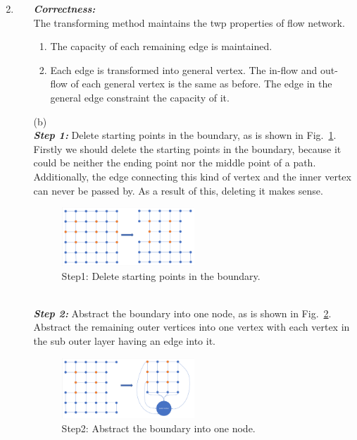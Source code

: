 \documentclass[12pt,a4paper]{article}
\makeatletter
\newtheorem*{solution}{Solution}
\theoremstyle{definition}
\renewenvironment{solution}[1][Solution] {\par\pushQED{\qed}\normalfont\topsep6\p@\@plus6\p@\relax\trivlist\item[\hskip\labelsep\bfseries#1\@addpunct{.}]\ignorespaces}{\popQED\endtrivlist\@endpefalse} \makeatother
\makeatother
\begin{document}
\begin{enumerate}
\begin{solution}
\begin{enumerate}
\begin{figure}[!htbp]
    	\end{figure}
    	\textbf{\textit{Correctness:}}
    	\\
    	The transforming method maintains the twp properties of flow network.
        \begin{enumerate}
            \item The capacity of each remaining edge is maintained.
            \item Each edge is transformed into general vertex. The in-flow and out-flow of each general vertex is the same as before. The edge in the general edge constraint the capacity of it.
        \end{enumerate}
    \item[(b)] ~\\
    \textbf{\textit{Step 1:}} Delete starting points in the boundary, as is shown in Fig.~\ref{Fig-STEP1}. 
    \\
    Firstly we should delete the starting points in the boundary, because it could be neither the ending point nor the middle point of a path. Additionally, the edge connecting this kind of  vertex and the inner vertex can never be passed by. As a result of this, deleting it makes sense.
    \begin{figure}[!htbp]
	\centering
	\includegraphics[width=0.5\textwidth]{Fig-P3T2SETP1.pdf}
	\caption{Step1: Delete starting points in the boundary.}
	\label{Fig-STEP1}
	\end{figure}
	\\
	\textbf{\textit{Step 2:}} Abstract the boundary into one node, as is shown in Fig.~\ref{Fig-STEP2}. 
    \\
    Abstract the remaining outer vertices into one vertex with each vertex in the sub outer layer having an edge into it.
    \begin{figure}[!htbp]
	\centering
	\includegraphics[width=0.5\textwidth]{Fig-P3T1STEP2.pdf}
	\caption{Step2: Abstract the boundary into one node.}
	\label{Fig-STEP2}
	\end{figure}
	

\end{enumerate}
\end{solution}
\end{enumerate}
\end{document}
